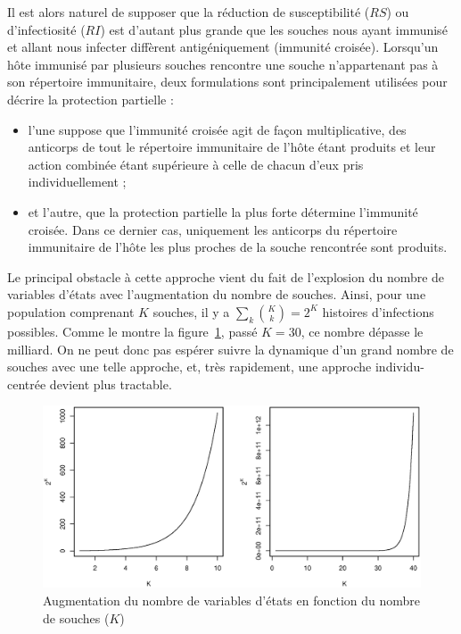 Il est alors naturel de supposer que la réduction de susceptibilité
($RS$) ou d'infectiosité ($RI$) est d'autant plus grande que les
souches nous ayant immunisé et allant nous infecter diffèrent
antigéniquement (immunité croisée). Lorsqu'un hôte immunisé par
plusieurs souches rencontre une souche n'appartenant pas à son
répertoire immunitaire, deux formulations sont principalement
utilisées pour décrire la protection partielle \citep{Gomes2002}:
\begin{itemize}
\item l'une suppose que l'immunité croisée agit de façon
  multiplicative, des anticorps de tout le répertoire immunitaire de
  l'hôte étant produits et leur action combinée étant supérieure à
  celle de chacun d'eux pris individuellement ;
\item et l'autre, que la protection partielle la plus forte détermine
  l'immunité croisée. Dans ce dernier cas, uniquement les anticorps du
  répertoire immunitaire de l'hôte les plus proches de la souche
  rencontrée sont produits.
\end{itemize}

Le principal obstacle à cette approche vient du fait de l'explosion du
nombre de variables d'états avec l'augmentation du nombre de souches.
Ainsi, pour une population comprenant $K$ souches, il y a $\sum_k
\binom{K}{k}=2^K$ histoires d'infections possibles. Comme le montre la
figure~\ref{fig:intro:multi}, passé $K=30$, ce nombre dépasse le
milliard. On ne peut donc pas espérer suivre la dynamique d'un grand
nombre de souches avec une telle approche, et, très rapidement, une
approche individu-centrée devient plus tractable.

\begin{figure}[!ht]
  \begin{center}
    \includegraphics[width=0.8\linewidth]{graphs/R/multi.eps}
  \end{center}
  \caption{Augmentation du nombre de variables d'états en
    fonction du nombre de souches ($K$)}
  \label{fig:intro:multi}
\end{figure}

